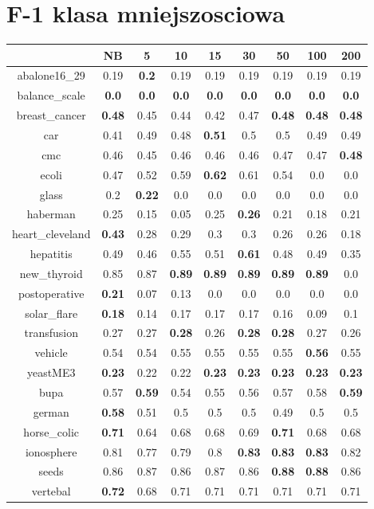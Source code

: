 \documentclass{article}%
\begin{document}
%
\section*{F{-}1 klasa mniejszosciowa}%
\begin{tabular}{c|cccccccc}%
\hline%
&NB&5&10&15&30&50&100&200\\%
\hline%
abalone16\_29&0.19&\textbf{0.2}&0.19&0.19&0.19&0.19&0.19&0.19\\%
\hline%
balance\_scale&\textbf{0.0}&\textbf{0.0}&\textbf{0.0}&\textbf{0.0}&\textbf{0.0}&\textbf{0.0}&\textbf{0.0}&\textbf{0.0}\\%
\hline%
breast\_cancer&\textbf{0.48}&0.45&0.44&0.42&0.47&\textbf{0.48}&\textbf{0.48}&\textbf{0.48}\\%
\hline%
car&0.41&0.49&0.48&\textbf{0.51}&0.5&0.5&0.49&0.49\\%
\hline%
cmc&0.46&0.45&0.46&0.46&0.46&0.47&0.47&\textbf{0.48}\\%
\hline%
ecoli&0.47&0.52&0.59&\textbf{0.62}&0.61&0.54&0.0&0.0\\%
\hline%
glass&0.2&\textbf{0.22}&0.0&0.0&0.0&0.0&0.0&0.0\\%
\hline%
haberman&0.25&0.15&0.05&0.25&\textbf{0.26}&0.21&0.18&0.21\\%
\hline%
heart\_cleveland&\textbf{0.43}&0.28&0.29&0.3&0.3&0.26&0.26&0.18\\%
\hline%
hepatitis&0.49&0.46&0.55&0.51&\textbf{0.61}&0.48&0.49&0.35\\%
\hline%
new\_thyroid&0.85&0.87&\textbf{0.89}&\textbf{0.89}&\textbf{0.89}&\textbf{0.89}&\textbf{0.89}&0.0\\%
\hline%
postoperative&\textbf{0.21}&0.07&0.13&0.0&0.0&0.0&0.0&0.0\\%
\hline%
solar\_flare&\textbf{0.18}&0.14&0.17&0.17&0.17&0.16&0.09&0.1\\%
\hline%
transfusion&0.27&0.27&\textbf{0.28}&0.26&\textbf{0.28}&\textbf{0.28}&0.27&0.26\\%
\hline%
vehicle&0.54&0.54&0.55&0.55&0.55&0.55&\textbf{0.56}&0.55\\%
\hline%
yeastME3&\textbf{0.23}&0.22&0.22&\textbf{0.23}&\textbf{0.23}&\textbf{0.23}&\textbf{0.23}&\textbf{0.23}\\%
\hline%
bupa&0.57&\textbf{0.59}&0.54&0.55&0.56&0.57&0.58&\textbf{0.59}\\%
\hline%
german&\textbf{0.58}&0.51&0.5&0.5&0.5&0.49&0.5&0.5\\%
\hline%
horse\_colic&\textbf{0.71}&0.64&0.68&0.68&0.69&\textbf{0.71}&0.68&0.68\\%
\hline%
ionosphere&0.81&0.77&0.79&0.8&\textbf{0.83}&\textbf{0.83}&\textbf{0.83}&0.82\\%
\hline%
seeds&0.86&0.87&0.86&0.87&0.86&\textbf{0.88}&\textbf{0.88}&0.86\\%
\hline%
vertebal&\textbf{0.72}&0.68&0.71&0.71&0.71&0.71&0.71&0.71\\%
\hline%
\end{tabular}
\end{document}
